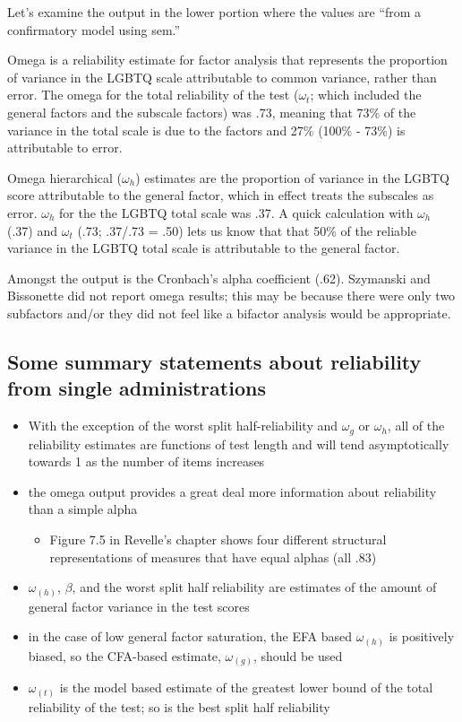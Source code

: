\documentclass[
  english,
]{book}
\providecommand{\tightlist}{%
  \setlength{\itemsep}{0pt}\setlength{\parskip}{0pt}}
\begin{document}
Let's examine the output in the lower portion where the values are ``from a confirmatory model using sem.''

Omega is a reliability estimate for factor analysis that represents the proportion of variance in the LGBTQ scale attributable to common variance, rather than error. The omega for the total reliability of the test (\(\omega_{t}\); which included the general factors and the subscale factors) was .73, meaning that 73\% of the variance in the total scale is due to the factors and 27\% (100\% - 73\%) is attributable to error.

Omega hierarchical (\(\omega_{h}\)) estimates are the proportion of variance in the LGBTQ score attributable to the general factor, which in effect treats the subscales as error. \(\omega_{h}\) for the the LGBTQ total scale was .37. A quick calculation with \(\omega_{h}\) (.37) and \(\omega_{t}\) (.73; .37/.73 = .50) lets us know that that 50\% of the reliable variance in the LGBTQ total scale is attributable to the general factor.

Amongst the output is the Cronbach's alpha coefficient (.62). Szymanski and Bissonette \citep{szymanski_perceptions_2020} did not report omega results; this may be because there were only two subfactors and/or they did not feel like a bifactor analysis would be appropriate.

\hypertarget{some-summary-statements-about-reliability-from-single-administrations}{%
\subsection{Some summary statements about reliability from single administrations}\label{some-summary-statements-about-reliability-from-single-administrations}}

\begin{itemize}
\tightlist
\item
  With the exception of the worst split half-reliability and \(\omega_{g}\) or \(\omega_{h}\), all of the reliability estimates are functions of test length and will tend asymptotically towards 1 as the number of items increases
\item
  the omega output provides a great deal more information about reliability than a simple alpha

  \begin{itemize}
  \tightlist
  \item
    Figure 7.5 in Revelle's chapter shows four different structural representations of measures that have equal alphas (all .83)
  \end{itemize}
\item
  \(\omega_{(h)}\), \(\beta\), and the worst split half reliability are estimates of the amount of general factor variance in the test scores
\item
  in the case of low general factor saturation, the EFA based \(\omega_{(h)}\) is positively biased, so the CFA-based estimate, \(\omega_{(g)}\), should be used
\item
  \(\omega_{(t)}\) is the model based estimate of the greatest lower bound of the total reliability of the test; so is the best split half reliability
\end{itemize}
\end{document}
